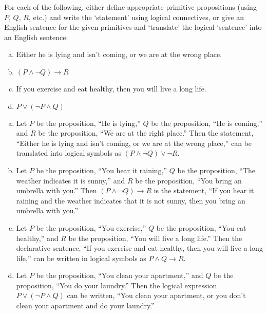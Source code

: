 \documentclass[11pt,letterpaper]{article}
\begin{document}
\newpage



 For each of the following, either define appropriate primitive propositions (using $P$, $Q$, $R$, etc.) and write the `statement' using logical connectives, or give an English sentence for the given primitives and `translate' the logical `sentence' into an English sentence:
	\begin{enumerate}[(a)]
	\item Either he is lying and isn't coming, or we are at the wrong place. 
	\item $(P \wedge \neg Q) \to R$
	\item If you exercise and eat healthy, then you will live a long life.
	\item $P \vee (\neg P \wedge Q)$
	\end{enumerate} \pspace

\sol
\begin{enumerate}[(a)]
\item Let $P$ be the proposition, ``He is lying,'' $Q$ be the proposition, ``He is coming,'' and $R$ be the proposition, ``We are at the right place.'' Then the statement, ``Either he is lying and isn't coming, or we are at the wrong place,'' can be translated into logical symbols as $(P \wedge \neg Q) \vee \neg R$. \pspace

\item Let $P$ be the proposition, ``You hear it raining,'' $Q$ be the proposition, ``The weather indicates it is sunny,'' and $R$ be the proposition, ``You bring an umbrella with you.'' Then $(P \wedge \neg Q) \to R$ is the statement, ``If you hear it raining and the weather indicates that it is not sunny, then you bring an umbrella with you.'' \pspace

\item Let $P$ be the proposition, ``You exercise,'' $Q$ be the proposition, ``You eat healthy,'' and $R$ be the proposition, ``You will live a long life.'' Then the declarative sentence, ``If you exercise and eat healthy, then you will live a long life,'' can be written in logical symbols as $P \wedge Q \to R$. \pspace

\item Let $P$ be the proposition, ``You clean your apartment,'' and $Q$ be the proposition, ``You do your laundry.'' Then the logical expression $P \vee (\neg P \wedge Q)$ can be written, ``You clean your apartment, or you don't clean your apartment and do your laundry.'' 
\end{enumerate}
\end{document}
